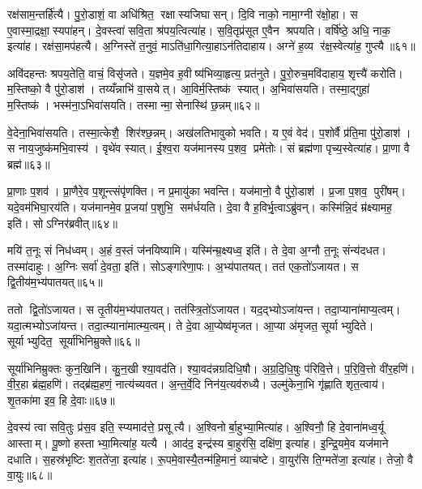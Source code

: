 रक्ष॑साम॒न्तर्\mbox{}हि॑त्यै। पु॒रो॒डाशं॒ वा अधि॑श्रित॒ रक्षास्यजिघासन्। दि॒वि नाको॒ नामा॒ग्नी र॑क्षो॒हा। स ए॒वास्मा॒द्रक्षा॒स्यपा॑हन्। दे॒वस्त्वा॑ सवि॒ता श्र॑पय॒त्वित्या॑ह। स॒वि॒तृप्र॑सूत ए॒वैन श्रपयति। वर्\mbox{}षि॑ष्ठे॒ अधि॒ नाक॒ इत्या॑ह। रक्ष॑सा॒मप॑हत्यै। अ॒ग्निस्ते॑ त॒नुवं॒ माऽति॑धा॒गित्या॒हाऽन॑तिदाहाय। अग्ने॑ ह॒व्य र॑क्ष॒स्वेत्या॑ह॒ गुप्त्यै॥६१॥

अवि॑दहन्तः श्रपय॒तेति॒ वाचं॒ विसृ॑जते। य॒ज्ञमे॒व ह॒वीष्य॑भिव्या॒हृत्य॒ प्रत॑नुते। पु॒रो॒रुच॒मवि॑दाहाय॒ शृत्त्यै॑ करोति। म॒स्तिष्को॒ वै पु॑रो॒डाश॑। तय्यँन्नाभि॑ वा॒सयेत्। आ॒विर्म॒स्तिष्क॑ स्यात्। अ॒भिवा॑सयति। तस्मा॒द्गुहा॑ म॒स्तिष्क॑। भस्म॑ना॒ऽभिवा॑सयति। तस्मान्मा॒सेनास्थि॑ छ॒न्नम्॥६२॥

वे॒देना॒भिवा॑सयति। तस्मा॒त्केशै॒ शिर॑श्छ॒न्नम्। अख॑लतिभावुको भवति। य ए॒वं वेद॑। प॒शोर्वै प्र॑ति॒मा पु॑रो॒डाश॑। स नाय॒जुष्क॑मभि॒वास्य॑। वृथे॑व स्यात्। ई॒श्व॒रा यज॑मानस्य प॒शव॒ प्रमे॑तोः। सं ब्रह्म॑णा पृच्य॒स्वेत्या॑ह। प्रा॒णा वै ब्रह्म॑॥६३॥

प्रा॒णाः प॒शव॑। प्रा॒णैरे॒व प॒शून्त्संपृ॑णक्ति। न प्र॒मायु॑का भवन्ति। यज॑मानो॒ वै पु॑रो॒डाश॑। प्र॒जा प॒शव॒ पुरी॑षम्। यदे॒वम॑भिघा॒रय॑ति। यज॑मानमे॒व प्र॒जया॑ प॒शुभि॒ सम॑र्धयति। दे॒वा वै ह॒विर्भृ॒त्वाऽब्रु॑वन्। कस्मि॑न्नि॒दं म्र॑क्ष्यामह॒ इति॑। सोऽग्निर॑ब्रवीत्॥६४॥

मयि॑ त॒नूः सं निध॑ध्वम्। अ॒हं व॒स्तं ज॑नयिष्यामि। यस्मि॑न्म्र॒क्ष्यध्व॒ इति॑। ते दे॒वा अ॒ग्नौ त॒नूः संन्य॑दधत। तस्मा॑दाहुः। अ॒ग्निः सर्वा॑ दे॒वता॒ इति॑। सोऽङ्गा॑रेणा॒पः। अ॒भ्य॑पातयत्। तत॑ एक॒तो॑ऽजायत। स द्वि॒तीय॑म॒भ्य॑पातयत्॥६५॥

ततो द्वि॒तो॑ऽजायत। स तृ॒तीय॑म॒भ्य॑पातयत्। तत॑स्त्रि॒तो॑ऽजायत। यद॒द्भ्योऽजा॑यन्त। तदा॒प्याना॑माप्य॒त्वम्। यदा॒त्मभ्योऽजा॑यन्त। तदा॒त्म्याना॑मात्म्य॒त्वम्। ते दे॒वा आ॒प्येष्व॑मृजत। आ॒प्या अ॑मृजत॒ सूर्याभ्युदिते। सूर्याभ्युदित॒ सूर्या॑भिनिम्रुक्ते॥६६॥

सूर्या॑भिनिम्रुक्तः कुन॒खिनि॑। कु॒न॒खी श्या॒वद॑ति। श्या॒वद॑न्नग्रदिधि॒षौ। अ॒ग्र॒दि॒धि॒षुः प॑रिवि॒त्ते। प॒रि॒वि॒त्तो वी॑र॒हणि॑। वी॒र॒हा ब्र॑ह्म॒हणि॑। तद्ब्र॑ह्म॒हणं॒ नात्य॑च्यवत। अ॒न्त॒र्वे॒दि निन॑य॒त्यव॑रुध्यै। उल्मु॑केना॒भि गृ॑ह्णाति शृत॒त्वाय॑। शृ॒तका॑मा इव॒ हि दे॒वाः॥६७॥\anuvakamend[अ॒न्या जि॑न्वन्त्यनु वि॒सृत्यै॒वमा॒हाशान्त आह॒ गुप्त्यै॑ छ॒न्नं ब्रह्माब्रवीद्द्वि॒तीय॑म॒भ्य॑पातय॒त्सूर्या॑भिनिम्रुक्ते दे॒वाः]

दे॒वस्य॑ त्वा सवि॒तुः प्र॑स॒व इति॒ स्प्यमाद॑त्ते॒ प्रसूत्यै। अ॒श्विनोर्बा॒हुभ्या॒मित्या॑ह। अ॒श्विनौ॒ हि दे॒वाना॑मध्व॒र्यू आस्ताम्। पू॒ष्णो हस्ताभ्या॒मित्या॑ह॒ यत्यै। आद॑द॒ इन्द्र॑स्य बा॒हुर॑सि॒ दक्षि॑ण॒ इत्या॑ह। इ॒न्द्रि॒यमे॒व यज॑माने दधाति। स॒हस्र॑भृष्टिः श॒तते॑जा॒ इत्या॑ह। रू॒पमे॒वास्यै॒तन्म॑हि॒मानं॒ व्याच॑ष्टे। वा॒युर॑सि ति॒ग्मते॑जा॒ इत्या॑ह। तेजो॒ वै वा॒युः॥६८॥

